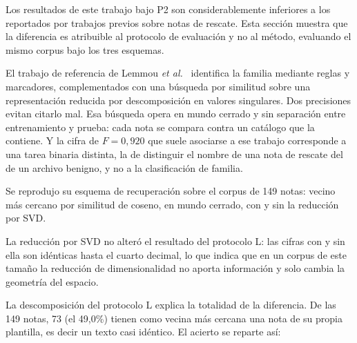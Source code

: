 Los resultados de este trabajo bajo P2 son considerablemente inferiores a los reportados por trabajos previos sobre notas de rescate. Esta sección muestra que la diferencia es atribuible al protocolo de evaluación y no al método, evaluando el mismo corpus bajo los tres esquemas.

El trabajo de referencia de Lemmou \textit{et al.}~\cite{paper_5_note_files} identifica la familia mediante reglas y marcadores, complementados con una búsqueda por similitud sobre una representación reducida por descomposición en valores singulares. Dos precisiones evitan citarlo mal. Esa búsqueda opera en mundo cerrado y sin separación entre entrenamiento y prueba: cada nota se compara contra un catálogo que la contiene. Y la cifra de $F = 0{,}920$ que suele asociarse a ese trabajo corresponde a una tarea binaria distinta, la de distinguir el nombre de una nota de rescate del de un archivo benigno, y no a la clasificación de familia.

Se reprodujo su esquema de recuperación sobre el corpus de 149 notas: vecino más cercano por similitud de coseno, en mundo cerrado, con y sin la reducción por SVD.

\begin{table}[ht]
\centering
\caption{El mismo corpus de 149 notas bajo tres protocolos de evaluación (combinado + LinearSVC, 50 semillas en P1 y P2; el protocolo L no usa semillas porque no hay partición)}
\label{tab:tres_protocolos}
\end{table}

La reducción por SVD no alteró el resultado del protocolo L: las cifras con y sin ella son idénticas hasta el cuarto decimal, lo que indica que en un corpus de este tamaño la reducción de dimensionalidad no aporta información y solo cambia la geometría del espacio.

La descomposición del protocolo L explica la totalidad de la diferencia. De las 149 notas, 73 (el 49,0\%) tienen como vecina más cercana una nota de su propia plantilla, es decir un texto casi idéntico. El acierto se reparte así:

